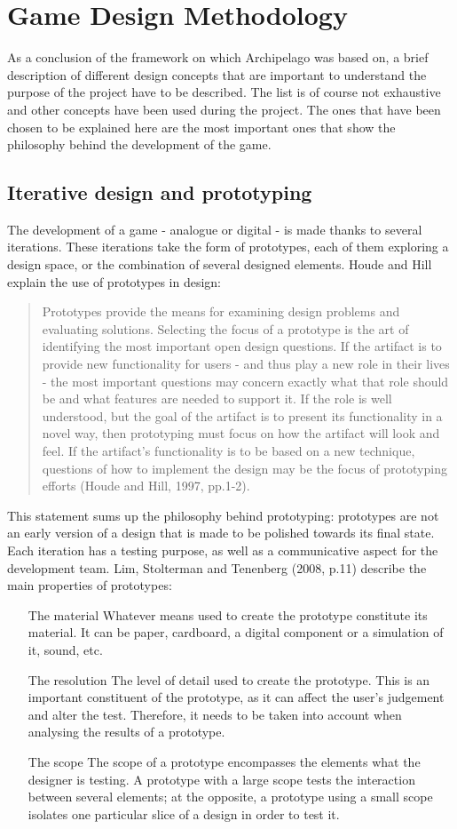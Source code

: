 \section{Game Design Methodology}
As a conclusion of the framework on which Archipelago was based on, a brief description of different design concepts that are important to understand the purpose of the project have to be described. The list is of course not exhaustive and other concepts have been used during the project. The ones that have been chosen to be explained here are the most important ones that show the philosophy behind the development of the game. 
\subsection{Iterative design and prototyping}
The development of a game - analogue or digital - is made thanks to several iterations. These iterations take the form of prototypes, each of them exploring a design space, or the combination of several designed elements. Houde and Hill explain the use of prototypes in design:
\begin{quotation}
Prototypes provide the means for examining design problems and evaluating solutions. Selecting the focus of a prototype is the art of identifying the most important open design questions. If the artifact is to provide new functionality for users - and thus play a new role in their lives - the most important questions may concern exactly what that role should be and what features are needed to support it. If the role is well understood, but the goal of the artifact is to present its functionality in a novel way, then prototyping must focus on how the artifact will look and feel. If the artifact’s functionality is to be based on a new technique, questions of how to implement the design may be the focus of prototyping efforts (Houde and Hill, 1997, pp.1-2)\cite{book:proto}.
\end{quotation}
This statement sums up the philosophy behind prototyping: prototypes are not an early version of a design that is made to be polished towards its final state. Each iteration has a testing purpose, as well as a communicative aspect for the development team. Lim, Stolterman and Tenenberg (2008, p.11)\cite{book:proto} describe the main properties of prototypes:
\begin{itemize}
\item[The material] Whatever means used to create the prototype constitute its material. It can be paper, cardboard, a digital component or a simulation of it, sound, etc.
\item[The resolution] The level of detail used to create the prototype. This is an important constituent of the prototype, as it can affect the user's judgement and alter the test. Therefore, it needs to be taken into account when analysing the results of a prototype. 
\item[The scope] The scope of a prototype encompasses the elements what the designer is testing. A prototype with a large scope tests the interaction between several elements; at the opposite, a prototype using a small scope isolates one particular slice of a design in order to test it.
\end{itemize}
